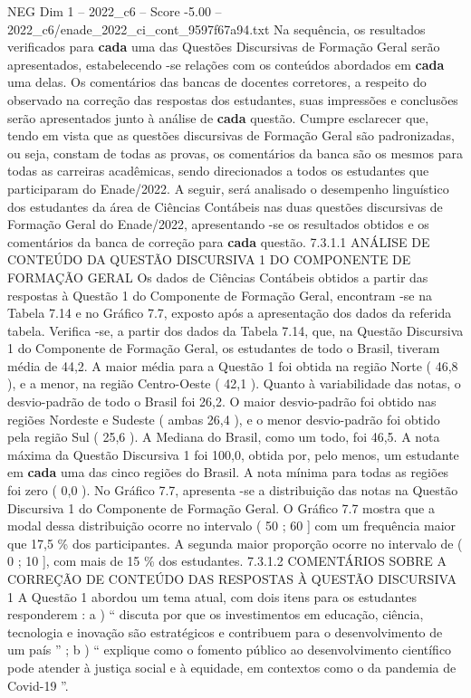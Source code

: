 \begin{textsample}{NEG Dim 1 – 2022\_c6 – Score -5.00 – 2022\_c6/enade\_2022\_ci\_cont\_9597f67a94.txt}
Na sequência, os resultados verificados para \textbf{cada} uma das Questões Discursivas de Formação Geral serão apresentados, estabelecendo -se relações com os conteúdos abordados em \textbf{cada} uma delas.
Os comentários das bancas de docentes corretores, a respeito do observado na correção das respostas dos estudantes, suas impressões e conclusões serão apresentados junto à análise de \textbf{cada} questão.
Cumpre esclarecer que, tendo em vista que as questões discursivas de Formação Geral são padronizadas, ou seja, constam de todas as provas, os comentários da banca são os mesmos para todas as carreiras acadêmicas, sendo direcionados a todos os estudantes que participaram do Enade/2022.
A seguir, será analisado o desempenho linguístico dos estudantes da área de Ciências Contábeis nas duas questões discursivas de Formação Geral do Enade/2022, apresentando -se os resultados obtidos e os comentários da banca de correção para \textbf{cada} questão. 7.3.1.1 ANÁLISE DE CONTEÚDO DA QUESTÃO DISCURSIVA 1 DO COMPONENTE DE FORMAÇÃO GERAL Os dados de Ciências Contábeis obtidos a partir das respostas à Questão 1 do Componente de Formação Geral, encontram -se na Tabela 7.14 e no Gráfico 7.7, exposto após a apresentação dos dados da referida tabela.
Verifica -se, a partir dos dados da Tabela 7.14, que, na Questão Discursiva 1 do Componente de Formação Geral, os estudantes de todo o Brasil, tiveram média de 44,2.
A maior média para a Questão 1 foi obtida na região Norte ( 46,8 ), e a menor, na região Centro-Oeste ( 42,1 ).
Quanto à variabilidade das notas, o desvio-padrão de todo o Brasil foi 26,2.
O maior desvio-padrão foi obtido nas regiões Nordeste e Sudeste ( ambas 26,4 ), e o menor desvio-padrão foi obtido pela região Sul ( 25,6 ).
A Mediana do Brasil, como um todo, foi 46,5.
A nota máxima da Questão Discursiva 1 foi 100,0, obtida por, pelo menos, um estudante em \textbf{cada} uma das cinco regiões do Brasil.
A nota mínima para todas as regiões foi zero ( 0,0 ).
No Gráfico 7.7, apresenta -se a distribuição das notas na Questão Discursiva 1 do Componente de Formação Geral.
O Gráfico 7.7 mostra que a modal dessa distribuição ocorre no intervalo ( 50 ; 60 ] com um frequência maior que 17,5 \% dos participantes.
A segunda maior proporção ocorre no intervalo de ( 0 ; 10 ], com mais de 15 \% dos estudantes. 7.3.1.2 COMENTÁRIOS SOBRE A CORREÇÃO DE CONTEÚDO DAS RESPOSTAS À QUESTÃO DISCURSIVA 1 A Questão 1 abordou um tema atual, com dois itens para os estudantes responderem : a ) “ discuta por que os investimentos em educação, ciência, tecnologia e inovação são estratégicos e contribuem para o desenvolvimento de um país ” ; b ) “ explique como o fomento público ao desenvolvimento científico pode atender à justiça social e à equidade, em contextos como o da pandemia de Covid-19 ”.

\end{textsample}
